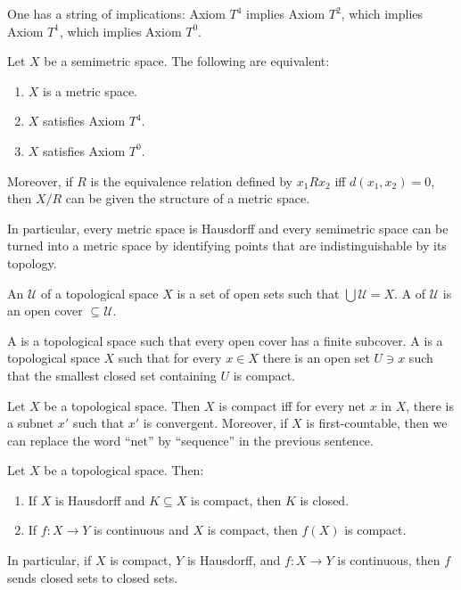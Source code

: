\begin{lemma}
One has a string of implications: Axiom $T^{4}$ implies Axiom $T^{2}$, which implies Axiom $T^{1}$, which implies Axiom $T^{0}$.
\end{lemma}

\begin{lemma}
Let $X$ be a semimetric space. The following are equivalent:
\begin{enumerate}
\item $X$ is a metric space.
\item $X$ satisfies Axiom $T^{4}$.
\item $X$ satisfies Axiom $T^{0}$.
\end{enumerate}
Moreover, if $R$ is the equivalence relation defined by $x_{1} R x_{2}$ iff $d(x_{1}, x_{2}) = 0$, then $X/R$ can be given the structure of a metric space.
\end{lemma}

\begin{subsec}
In particular, every metric space is Hausdorff and every semimetric space can be turned into a metric space by identifying points that are indistinguishable by its topology.
\end{subsec}

\begin{definition}
An  $\mathcal U$ of a topological space $X$ is a set of open sets such that $\bigcup \mathcal U = X$.
A  of $\mathcal U$ is an open cover $\subseteq \mathcal U$.
\end{definition}

\begin{definition}
A  is a topological space such that every open cover has a finite subcover.
A  is a topological space $X$ such that for every $x \in X$ there is an open set $U \ni x$ such that the smallest closed set containing $U$ is compact.
\end{definition}

\begin{lemma}
Let $X$ be a topological space. Then $X$ is compact iff for every net $x$ in $X$, there is a subnet $x'$ such that $x'$ is convergent.
Moreover, if $X$ is first-countable, then we can replace the word ``net'' by ``sequence'' in the previous sentence.
\end{lemma}

\begin{lemma}
Let $X$ be a topological space. Then:
\begin{enumerate}
\item If $X$ is Hausdorff and $K \subseteq X$ is compact, then $K$ is closed.
\item If $f: X \to Y$ is continuous and $X$ is compact, then $f(X)$ is compact.
\end{enumerate}
In particular, if $X$ is compact, $Y$ is Hausdorff, and $f: X \to Y$ is continuous, then $f$ sends closed sets to closed sets.
\end{lemma}

